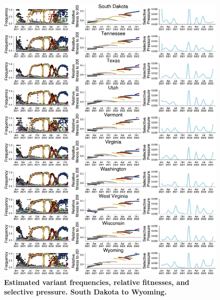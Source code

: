 \documentclass[11pt,oneside,letterpaper]{article}
\begin{document}
\begin{figure}[t!]
    \centering
    \includegraphics[width=1.0\textwidth=0.01]{./supplementary_figures/selective-pressure-analysis_group_5.png}
    \caption{
      \textbf{Estimated variant frequencies, relative fitnesses, and selective pressure. South Dakota to Wyoming.}
    }
    \label{fig:selective_pressure_group_5}
\end{figure}
\end{document}
